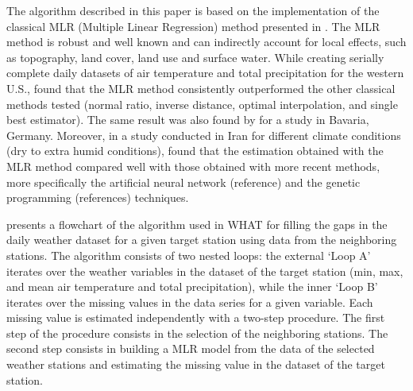 \documentclass[TechnicalNoteMeteo.tex]{subfiles}
\begin{document}
The algorithm described in this paper is based on the implementation of the classical MLR (Multiple Linear Regression) method presented in \cite{eischeid_creating_2000}. The MLR method is robust and well known and can indirectly account for local effects, such as topography, land cover, land use and surface water. While creating serially complete daily datasets of air temperature and total precipitation for the western U.S., \cite{eischeid_creating_2000} found that the MLR method consistently outperformed the other classical methods tested (normal ratio, inverse distance, optimal interpolation, and single best estimator). The same result was also found by \cite{xia_forest_1999} for a study in Bavaria, Germany. Moreover, in a study conducted in Iran for different climate conditions (dry to extra humid conditions), \cite{kashani_evaluation_2011} found that the estimation obtained with the MLR method compared well with those obtained with more recent methods, more specifically the artificial neural network (reference) and the genetic programming (references) techniques.

 presents a flowchart of the algorithm used in WHAT for filling the gaps in the daily weather dataset for a given target station using data from the neighboring stations. The algorithm consists of two nested loops: the external `Loop A' iterates over the weather variables in the dataset of the target station (min, max, and mean air temperature and total precipitation), while the inner `Loop B' iterates over the missing values in the data series for a given variable. Each missing value is estimated independently with a two-step procedure. The first step of the procedure consists in the selection of the neighboring stations. The second step consists in building a MLR model from the data of the selected weather stations and estimating the missing value in the dataset of the target station. 
\end{document}
